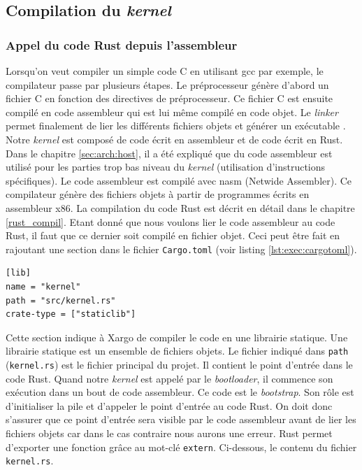 
\subsection{Compilation du \textit{kernel}}
\subsubsection{Appel du code Rust depuis l'assembleur}
Lorsqu'on veut compiler un simple code C en utilisant \acrshort{gcc} par
exemple, le compilateur passe par plusieurs étapes. Le préprocesseur génère d'abord
un fichier C en fonction des directives de préprocesseur. Ce fichier C est ensuite
compilé en code assembleur qui est lui même compilé en code objet. Le \textit{linker}
permet finalement de lier les différents fichiers objets et générer un exécutable \cite{ref42}.
Notre \textit{kernel} est composé de code écrit en assembleur et de code écrit
en Rust. Dans le chapitre \ref{sec:arch:host}, il a été expliqué que du code assembleur
est utilisé pour les parties trop bas niveau du \textit{kernel} (utilisation d'instructions
spécifiques). Le code assembleur est compilé avec \acrshort{nasm} (Netwide Assembler).
Ce compilateur génère des fichiers objets à partir de programmes écrits en assembleur
x86. La compilation du code Rust est décrit en détail dans le chapitre \ref{rust_compil}.
Etant donné que nous voulons lier le code assembleur au code Rust, il faut que
ce dernier soit compilé en fichier objet. Ceci peut être fait en rajoutant une section
dans le fichier \texttt{Cargo.toml} (voir listing \ref{lst:exec:cargotoml}).

\begin{code}
\begin{verbatim}
[lib]
name = "kernel"
path = "src/kernel.rs"
crate-type = ["staticlib"]
\end{verbatim}
\caption{Section \texttt{lib} du fichier \texttt{Cargo.toml}}
\label{lst:exec:cargotoml}
\end{code} \bigbreak

Cette section indique à Xargo de compiler le code en une librairie statique.
Une librairie statique est un ensemble de fichiers objets. Le fichier indiqué
dans \texttt{path} (\texttt{kernel.rs}) est le fichier principal
du projet. Il contient le point d'entrée dans le code Rust. Quand notre \textit{kernel}
est appelé par le \textit{bootloader}, il commence son exécution dans un bout de
code assembleur. Ce code est le \textit{bootstrap}. Son rôle est d'initialiser
la pile et d'appeler le point d'entrée au code Rust. On doit donc s'assurer que
ce point d'entrée sera visible par le code assembleur avant de lier les fichiers
objets car dans le cas contraire nous aurons une erreur. Rust permet d'exporter
une fonction grâce au mot-clé \texttt{extern}. Ci-dessous, le contenu
du fichier \texttt{kernel.rs}.


